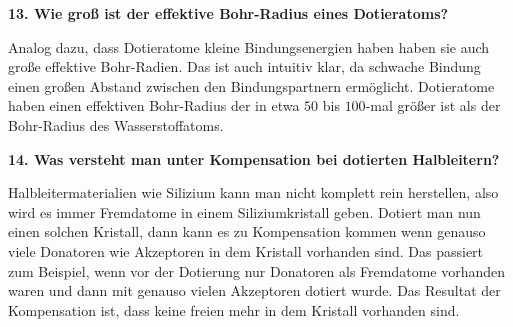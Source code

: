 \noindent\textbf{13. Wie groß ist der effektive Bohr-Radius eines Dotieratoms?}\\
\begin{addmargin}[25pt]{0pt}
Analog dazu, dass Dotieratome kleine Bindungsenergien haben haben sie auch große effektive Bohr-Radien. Das ist auch intuitiv klar, da schwache Bindung einen großen Abstand zwischen den Bindungspartnern ermöglicht. Dotieratome haben einen effektiven Bohr-Radius der in etwa $50$ bis $100$-mal größer ist als der Bohr-Radius des Wasserstoffatoms.   \\
\end{addmargin}

\noindent\textbf{14. Was versteht man unter \glqq Kompensation\grqq \; bei dotierten Halbleitern?}\\
\begin{addmargin}[25pt]{0pt}
Halbleitermaterialien wie Silizium kann man nicht komplett rein herstellen, also wird es immer Fremdatome in einem Siliziumkristall geben. Dotiert man nun einen solchen Kristall, dann kann es zu Kompensation kommen wenn genauso viele Donatoren wie Akzeptoren in dem Kristall vorhanden sind. Das passiert zum Beispiel, wenn vor der Dotierung nur Donatoren als Fremdatome vorhanden waren und dann mit genauso vielen Akzeptoren dotiert wurde. Das Resultat der Kompensation ist, dass keine freien mehr in dem Kristall vorhanden sind.\\
\end{addmargin}

